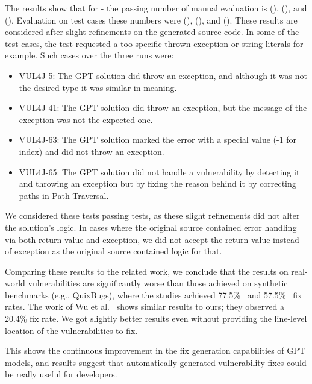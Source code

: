 The results show that for  -  the passing number of manual evaluation is  (),  (), and  ().
Evaluation on test cases these numbers were  (),  (), and  ().
These results are considered after slight refinements on the generated source code.
In some of the test cases, the test requested a too specific thrown exception or string literals for example.
Such cases over the three runs were:
\begin{itemize}
\item VUL4J-5: The GPT solution did throw an exception, and although it was not the desired type it was similar in meaning.
\item VUL4J-41: The GPT solution did throw an exception, but the message of the exception was not the expected one.
\item VUL4J-63: The GPT solution marked the error with a special value (-1 for index) and did not throw an exception.
\item VUL4J-65: The GPT solution did not handle a vulnerability by detecting it and throwing an exception but by fixing the reason behind it by correcting paths in Path Traversal.
\end{itemize}


We considered these tests passing tests, as these slight refinements did not alter the solution's logic.
In cases where the original source contained error handling via both return value and exception, we did not accept the return value instead of exception as the original source contained logic for that.

Comparing these results to the related work, we conclude that the results on real-world vulnerabilities are significantly worse than those achieved on synthetic benchmarks (e.g., QuixBugs), where the studies achieved 77.5\%~\cite{quix_bugs_abuser_2} and 57.5\%~\cite{codex_bug_fix} fix rates.
The work of Wu et al.~\cite{same_as_us_but_too_much_hint} shows similar results to ours; they observed a 20.4\% fix rate.
We got slightly better results even without providing the line-level location of the vulnerabilities to fix.

This shows the continuous improvement in the fix generation capabilities of GPT models, and results suggest that automatically generated vulnerability fixes could be really useful for developers.


